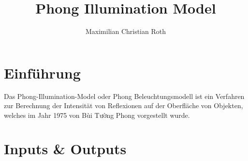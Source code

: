 \documentclass[a4paper]{scrartcl}%
\title{Phong Illumination Model}
\author{Maximilian Christian Roth}
\begin{document}

\maketitle
\tableofcontents

\newpage

\section{Einführung}%
\label{sec:einfuhrung}

    Das Phong-Illumination-Model oder Phong Beleuchtungsmodell ist ein Verfahren zur Berechnung der Intensität von Reflexionen auf der Oberfläche von Objekten,\\
    welches im Jahr 1975 von Bùi Tường Phong \footnotemark[1] vorgestellt wurde.\\

\section{Inputs \& Outputs}%
\label{sec:inputs_outputs}
\end{document}
